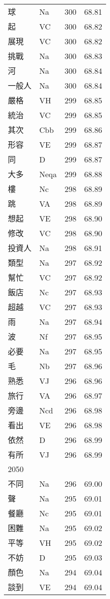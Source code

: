 \documentclass[twocolumn]{book}
\begin{document}
\begin{supertabular}{llrr}
球 & Na & 300 &  68.81\\
起 & VC & 300 &  68.82\\
展現 & VC & 300 &  68.82\\
挑戰 & Na & 300 &  68.83\\
河 & Na & 300 &  68.84\\
一般人 & Na & 300 &  68.84\\
嚴格 & VH & 299 &  68.85\\
統治 & VC & 299 &  68.85\\
其次 & Cbb & 299 &  68.86\\
形容 & VE & 299 &  68.87\\
同 & D & 299 &  68.87\\
大多 & Neqa & 299 &  68.88\\
樓 & Nc & 298 &  68.89\\
跳 & VA & 298 &  68.89\\
想起 & VE & 298 &  68.90\\
修改 & VC & 298 &  68.90\\
投資人 & Na & 298 &  68.91\\
類型 & Na & 297 &  68.92\\
幫忙 & VC & 297 &  68.92\\
飯店 & Nc & 297 &  68.93\\
超越 & VC & 297 &  68.93\\
雨 & Na & 297 &  68.94\\
波 & Nf & 297 &  68.95\\
必要 & Na & 297 &  68.95\\
毛 & Nb & 297 &  68.96\\
熟悉 & VJ & 296 &  68.96\\
旅行 & VA & 296 &  68.97\\
旁邊 & Ncd & 296 &  68.98\\
看出 & VE & 296 &  68.98\\
依然 & D & 296 &  68.99\\
有所 & VJ & 296 &  68.99\\
2050\\
不同 & Na & 296 &  69.00\\
聲 & Na & 295 &  69.01\\
餐廳 & Nc & 295 &  69.01\\
困難 & Na & 295 &  69.02\\
平等 & VH & 295 &  69.02\\
不妨 & D & 295 &  69.03\\
顏色 & Na & 294 &  69.04\\
談到 & VE & 294 &  69.04\\

\end{supertabular}
\end{document}
